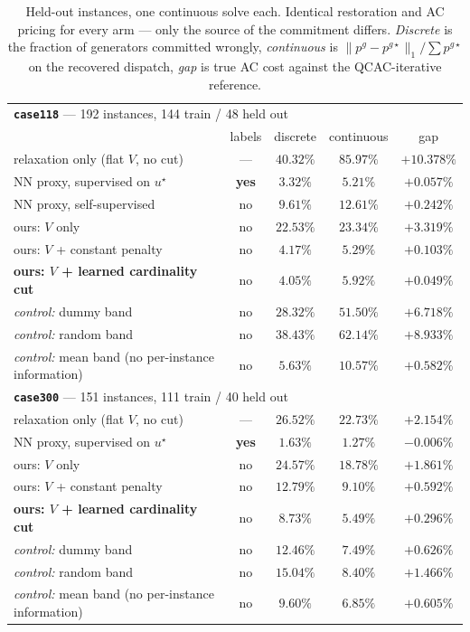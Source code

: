 \documentclass[11pt]{article}
\begin{document}
\begin{table}[h]\centering\small
\caption{Held-out instances, one continuous solve each. Identical restoration
and AC pricing for every arm --- only the source of the commitment differs.
\emph{Discrete} is the fraction of generators committed wrongly, \emph{continuous}
is $\|p^g-p^{g\star}\|_1/\sum p^{g\star}$ on the recovered dispatch, \emph{gap} is
true AC cost against the QCAC-iterative reference.}
\begin{tabular}{lcccc}
\toprule
\multicolumn{5}{l}{\textbf{\texttt{case118}} --- 192 instances, 144 train / 48 held out}\\
& labels & discrete & continuous & gap \\
\midrule
relaxation only (flat $V$, no cut) & --- & $40.32\%$ & $85.97\%$ & $+10.378\%$\\
NN proxy, supervised on $u^\star$ & \textbf{yes} & $3.32\%$ & $5.21\%$ & $+0.057\%$\\
NN proxy, self-supervised & no & $9.61\%$ & $12.61\%$ & $+0.242\%$\\
ours: $V$ only & no & $22.53\%$ & $23.34\%$ & $+3.319\%$\\
ours: $V$ + constant penalty & no & $4.17\%$ & $5.29\%$ & $+0.103\%$\\
\textbf{ours: $V$ + learned cardinality cut} & no & $\mathbf{4.05\%}$ & $5.92\%$ & $\mathbf{+0.049\%}$\\
\emph{control:} dummy band & no & $28.32\%$ & $51.50\%$ & $+6.718\%$\\
\emph{control:} random band & no & $38.43\%$ & $62.14\%$ & $+8.933\%$\\
\emph{control:} mean band (no per-instance information) & no & $5.63\%$ & $10.57\%$ & $+0.582\%$\\
\midrule
\multicolumn{5}{l}{\textbf{\texttt{case300}} --- 151 instances, 111 train / 40 held out}\\
\midrule
relaxation only (flat $V$, no cut) & --- & $26.52\%$ & $22.73\%$ & $+2.154\%$\\
NN proxy, supervised on $u^\star$ & \textbf{yes} & $1.63\%$ & $1.27\%$ & $-0.006\%$\\
ours: $V$ only & no & $24.57\%$ & $18.78\%$ & $+1.861\%$\\
ours: $V$ + constant penalty & no & $12.79\%$ & $9.10\%$ & $+0.592\%$\\
\textbf{ours: $V$ + learned cardinality cut} & no & $\mathbf{8.73\%}$ & $\mathbf{5.49\%}$ & $\mathbf{+0.296\%}$\\
\emph{control:} dummy band & no & $12.46\%$ & $7.49\%$ & $+0.626\%$\\
\emph{control:} random band & no & $15.04\%$ & $8.40\%$ & $+1.466\%$\\
\emph{control:} mean band (no per-instance information) & no & $9.60\%$ & $6.85\%$ & $+0.605\%$\\
\bottomrule
\end{tabular}
\end{table}
\end{document}

